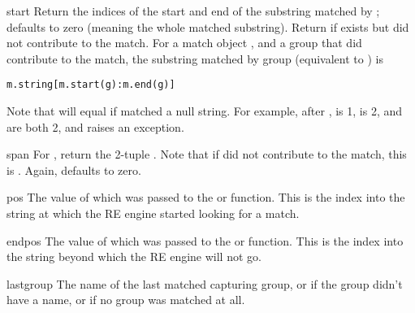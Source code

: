 \begin{methoddesc}[MatchObject]{start}{}
Return the indices of the start and end of the substring
matched by ;  defaults to zero (meaning the whole
matched substring).
Return  if  exists but
did not contribute to the match.  For a match object
, and a group  that did contribute to the match, the
substring matched by group  (equivalent to
) is

\begin{verbatim}
m.string[m.start(g):m.end(g)]
\end{verbatim}

Note that
 will equal  if
 matched a null string.  For example, after ,  is 1,
 is 2,  and
 are both 2, and  raises
an  exception.
\end{methoddesc}

\begin{methoddesc}[MatchObject]{span}{}
For  , return the 2-tuple
.
Note that if  did not contribute to the match, this is
.  Again,  defaults to zero.
\end{methoddesc}

\begin{memberdesc}[MatchObject]{pos}
The value of  which was passed to the
 or  function.  This is the index
into the string at which the RE engine started looking for a match.
\end{memberdesc}

\begin{memberdesc}[MatchObject]{endpos}
The value of  which was passed to the
 or  function.  This is the index
into the string beyond which the RE engine will not go.
\end{memberdesc}

\begin{memberdesc}[MatchObject]{lastgroup}
The name of the last matched capturing group, or  if the
group didn't have a name, or if no group was matched at all.
\end{memberdesc}

